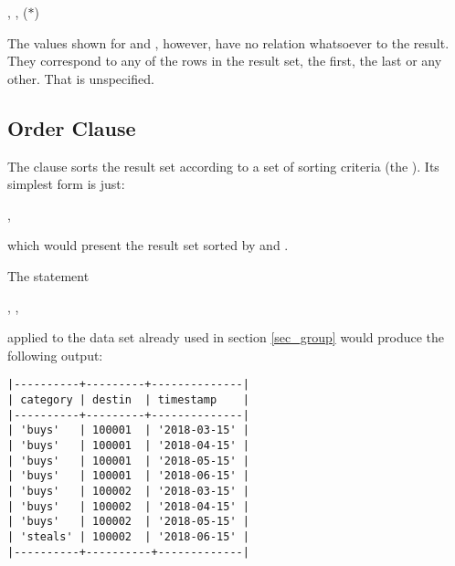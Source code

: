  ,
                 ,
                 ($\ast$)
 

The values shown for  and ,
however, have no relation whatsoever to the 
result. They correspond
to any of the rows in the result set,
the first, the last or any other.
That is unspecified.



\subsection{Order Clause}
The  clause sorts the result set
according to a set of sorting criteria (the ).
Its simplest form is just:

 , 

which would present the result set
sorted by  and .

\begin{minipage}{\textwidth}
The statement

 , 
 
 , 
\end{minipage}

applied to the data set already used in section
\ref{sec_group} would produce the following output:

\begin{minipage}{\textwidth}
\begin{verbatim}
|----------+---------+--------------|
| category | destin  | timestamp    |
|----------+---------+--------------|
| 'buys'   | 100001  | '2018-03-15' |
| 'buys'   | 100001  | '2018-04-15' |
| 'buys'   | 100001  | '2018-05-15' |
| 'buys'   | 100001  | '2018-06-15' |
| 'buys'   | 100002  | '2018-03-15' |
| 'buys'   | 100002  | '2018-04-15' |
| 'buys'   | 100002  | '2018-05-15' |
| 'steals' | 100002  | '2018-06-15' |
|----------+----------+-------------|
\end{verbatim}
\end{minipage}

